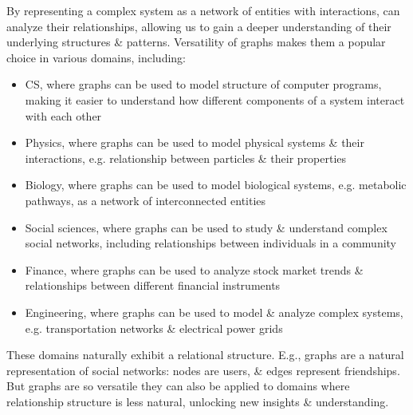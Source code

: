 \documentclass{article}
\begin{document}
\begin{itemize}
\begin{itemize}
        By representing a complex system as a network of entities with interactions, can analyze their relationships, allowing us to gain a deeper understanding of their underlying structures \& patterns. Versatility of graphs makes them a popular choice in various domains, including:
        \begin{itemize}
            \item CS, where graphs can be used to model structure of computer programs, making it easier to understand how different components of a system interact with each other
            \item Physics, where graphs can be used to model physical systems \& their interactions, e.g. relationship between particles \& their properties
            \item Biology, where graphs can be used to model biological systems, e.g. metabolic pathways, as a network of interconnected entities
            \item Social sciences, where graphs can be used to study \& understand complex social networks, including relationships between individuals in a community
            \item Finance, where graphs can be used to analyze stock market trends \& relationships between different financial instruments
            \item Engineering, where graphs can be used to model \& analyze complex systems, e.g. transportation networks \& electrical power grids
        \end{itemize}
        These domains naturally exhibit a relational structure. E.g., graphs are a natural representation of social networks: nodes are users, \& edges represent friendships. But graphs are so versatile they can also be applied to domains where relationship structure is less natural, unlocking new insights \& understanding.


\end{itemize}
\end{itemize}
\end{document}
